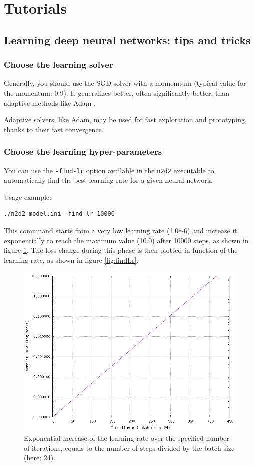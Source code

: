 \documentclass[a4paper,11pt,oneside]{article}
\begin{document}
\clearpage

\section{Tutorials}

\subsection{Learning deep neural networks: tips and tricks}


\subsubsection{Choose the learning solver}

Generally, you should use the SGD solver with a momemtum (typical value for the momentum: 0.9). It generalizes better, often significantly better, than adaptive methods like Adam \citep{2017arXiv170508292W}.

Adaptive solvers, like Adam, may be used for fast exploration and prototyping, thanks to their fast convergence.


\subsubsection{Choose the learning hyper-parameters}

You can use the \lstinline!-find-lr! option available in the \lstinline!n2d2! executable to automatically find the best learning rate for a given neural network.

Usage example:
\begin{lstlisting}
./n2d2 model.ini -find-lr 10000
\end{lstlisting}

This commnand starts from a very low learning rate (1.0e-6) and increase it exponentially to reach the maximum value (10.0) after 10000 steps, as shown in figure \ref{fig:findLrRange}. The loss change during this phase is then plotted in function of the learning rate, as shown in figure \ref{fig:findLr}.

\begin{figure}[H]
  \centering
  \includegraphics[width=0.8\linewidth]{figs/find_lr-range.png}
  \caption{Exponential increase of the learning rate over the specified number of iterations, equals to the number of steps divided by the batch size (here: 24).}
  \label{fig:findLrRange}
\end{figure}
\end{document}
